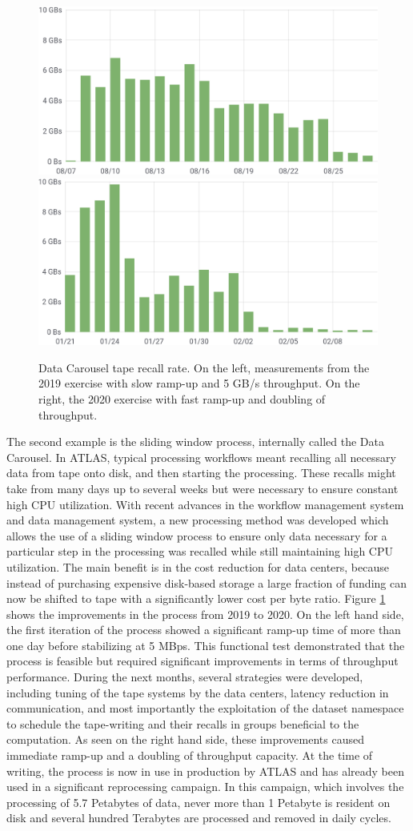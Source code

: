 \documentclass[11pt]{article}
\begin{document}
\begin{figure}[t]
    \centering
    \includegraphics[width=0.49\linewidth]{figs/data_carousel_2019.png}
    \hfill
    \includegraphics[width=0.49\linewidth]{figs/data_carousel_2020.png}
    \caption{Data Carousel tape recall rate. On the left, measurements from the 2019 exercise with slow ramp-up and 5 GB/s throughput. On the right, the 2020 exercise with fast ramp-up and doubling of throughput.}
    \label{fig:data_carousel}
\end{figure}

The second example is the sliding window process, internally called the Data Carousel. In ATLAS, typical processing workflows meant recalling all necessary data from tape onto disk, and then starting the processing. These recalls might take from many days up to several weeks but were necessary to ensure constant high CPU utilization. With recent advances in the workflow management system and data management system, a new processing method was developed which allows the use of a sliding window process to ensure only data necessary for a particular step in the processing was recalled while still maintaining high CPU utilization. The main benefit is in the cost reduction for data centers, because instead of purchasing expensive disk-based storage a large fraction of funding can now be shifted to tape with a significantly lower cost per byte ratio. Figure \ref{fig:data_carousel} shows the improvements in the process from 2019 to 2020. On the left hand side, the first iteration of the process showed a significant ramp-up time of more than one day before stabilizing at 5 MBps. This functional test demonstrated that the process is feasible but required significant improvements in terms of throughput performance. During the next months, several strategies were developed, including tuning of the tape systems by the data centers, latency reduction in communication, and most importantly the exploitation of the dataset namespace to schedule the tape-writing and their recalls in groups beneficial to the computation. As seen on the right hand side, these improvements caused immediate ramp-up and a doubling of throughput capacity. At the time of writing, the process is now in use in production by ATLAS and has already been used in a significant reprocessing campaign. In this campaign, which involves the processing of 5.7 Petabytes of data, never more than 1 Petabyte is resident on disk and several hundred Terabytes are processed and removed in daily cycles.
\end{document}
